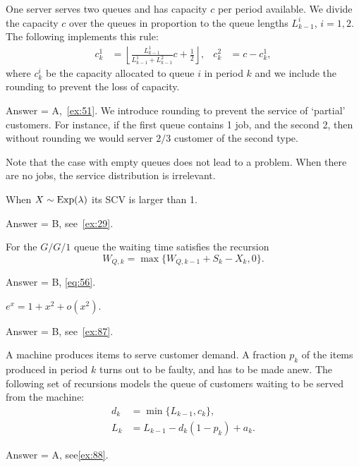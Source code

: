\begin{exercise}[201904]
 One server serves two queues and has capacity $c$ per period available.
 We divide the capacity $c$ over the queues in proportion to the queue lengths $L^i_{k-1}$, $i=1,2$.
 The following implements this rule:
 \begin{align*}
 c_k^1 &= \left\lfloor \frac{L_{k-1}^1}{L_{k-1}^1 + L_{k-1}^2} c + \frac 1 2 \right\rfloor, & c_k^2 &= c - c_k^1,
 \end{align*}
 where $c_k^i$ be the capacity allocated to queue $i$ in period $k$ and we include the rounding to prevent the loss of capacity.

\begin{solution}
 Answer = A,~\cref{ex:51}.
 We introduce rounding to prevent the service of `partial' customers.
 For instance, if the first queue contains 1 job, and the second 2, then without rounding we would server $2/3$ customer of the second type.

 Note that the case with empty queues does not lead to a problem.
 When there are no jobs, the service distribution is irrelevant.
\end{solution}
\end{exercise}


\begin{exercise}[201904]
When $X\sim\operatorname{Exp}(\lambda)$ its SCV is larger than 1.
\begin{solution} Answer = B, see~\cref{ex:29}.
\end{solution}
\end{exercise}

\begin{exercise}[201904]
 For the $G/G/1$ queue the waiting time satisfies the recursion
 \begin{equation*}
 W_{Q,k} = \max\{W_{Q,k-1} + S_{k}-X_k, 0\}.
 \end{equation*}
\begin{solution} Answer = B, \eqref{eq:56}.
\end{solution}
\end{exercise}


\begin{exercise}[201907]
$e^{x} = 1 +x^2 + o(x^2)$.
\begin{solution}
Answer = B, see~\cref{ex:87}.
\end{solution}
\end{exercise}

\begin{exercise}[201907]
 A machine produces items to serve customer demand.
 A fraction $p_k$ of the items produced in period $k$ turns out to be faulty, and has to be made anew.
 The following set of recursions models the queue of customers waiting to be served from the machine:
 \begin{align*}
 d_k &= \min\{L_{k-1}, c_k\}, \\
 L_k &= L_{k-1}-d_k(1-p_k) + a_k.
 \end{align*}
\begin{solution}
Answer = A, see\cref{ex:88}.
\end{solution}
\end{exercise}

